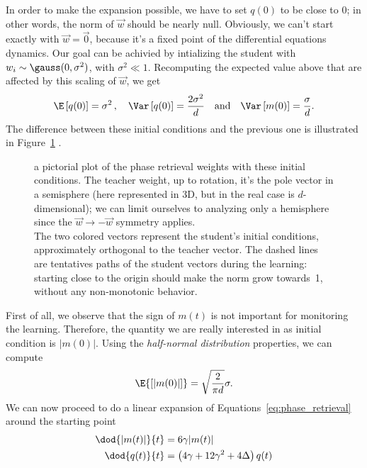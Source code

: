 In order to make the expansion possible, we have to set \(q(0)\) to be close to 0;
in other words, the norm of \(\vec{w}\) should be nearly null.
Obviously, we can't start exactly with \(\vec{w}=\vec{0}\), because it's a fixed point
of the differential equations dynamics.
Our goal can be achivied by intializing the student with \(w_{i}\sim\gauss(0,\sigma^2)\),
with \(\sigma^2\ll1\).
Recomputing the expected value above that are affected by this scaling of \(\vec{w}\), we get 
\[
  \E\left[q(0)\right] = \sigma^2\,, \quad
  \Var\left[q(0)\right] = \frac{2\sigma^2}{d}\quad\text{and}\quad
  \Var\left[m{(0)}\right] = \frac{\sigma}{d}. 
\]
The difference between these initial conditions and the previous one is illustrated in Figure~\ref{fig:pictorial-unconstrainted-phase-retrieval} .
\begin{figure}
  \centering
  \begin{tikzpicture}  
    
  \end{tikzpicture}
  \caption{
    a pictorial plot of the phase retrieval weights with these initial conditions.
    The teacher weight, up to rotation, it's the pole vector in a semisphere 
    (here represented in 3D, but in the real case is \(d\)-dimensional);
    we can limit ourselves to analyzing only a hemisphere since the \(\vec{w}\to-\vec{w}\) symmetry applies.\\
    The two colored vectors represent the student's initial conditions, approximately orthogonal to the teacher vector. 
    The dashed lines are tentatives paths of the student vectors during the learning: starting close to the origin
    should make the norm grow towards~1, without any non-monotonic behavior.
  }
  \label{fig:pictorial-unconstrainted-phase-retrieval} 
\end{figure}
First of all, we observe that the sign of \(m(t)\) is not important for monitoring the learning. Therefore, the quantity
we are really interested in as initial condition is \(|m{(0)}|\). Using the \emph{half-normal distribution} properties\cite{enwiki:halfnormaldistribution},
we can compute
\[
  \E{\left[|m{(0)}|\right]} = \sqrt{\frac{2}{\pi d}}\sigma.
\]
We can now proceed to do a linear expansion of Equations~\eqref{eq:phase_retrieval} around the starting point
\begin{subequations}\begin{align}
  \dod{|m{(t)}|}{t} &= 6 \gamma |m{(t)}|\\
  \label{eq:sigma_phase_retrieval_q}
  \dod{q{(t)}}{t} &= \left(4 \gamma + 12 \gamma^2 + 4\Delta\right) q{(t)}
\end{align}\end{subequations}
